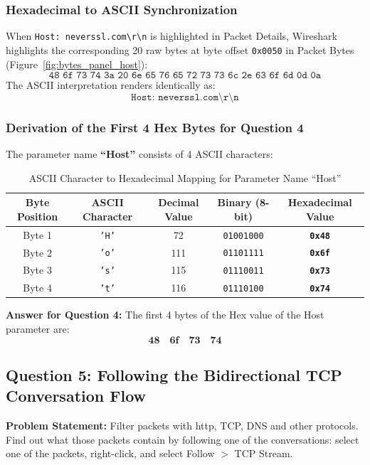 \documentclass[11pt,a4paper]{article}
\begin{document}
\subsubsection{Hexadecimal to ASCII Synchronization}
When \texttt{Host: neverssl.com\textbackslash r\textbackslash n} is highlighted in Packet Details, Wireshark highlights the corresponding 20 raw bytes at byte offset \texttt{0x0050} in Packet Bytes (Figure~\ref{fig:bytes_panel_host}):
$$\texttt{48 6f 73 74 3a 20 6e 65 76 65 72 73 73 6c 2e 63 6f 6d 0d 0a}$$
The ASCII interpretation renders identically as:
$$\texttt{Host: neverssl.com\textbackslash r\textbackslash n}$$

\subsubsection{Derivation of the First 4 Hex Bytes for Question 4}
The parameter name \textbf{``Host''} consists of 4 ASCII characters:
\begin{table}[H]
\centering
\caption{ASCII Character to Hexadecimal Mapping for Parameter Name ``Host''}
\label{tab:ascii_hex}
\begin{tabular}{ccccc}
\toprule
\textbf{Byte Position} & \textbf{ASCII Character} & \textbf{Decimal Value} & \textbf{Binary (8-bit)} & \textbf{Hexadecimal Value} \\
\midrule
Byte 1 & \texttt{'H'} & 72 & \texttt{01001000} & \texttt{\textbf{0x48}} \\
Byte 2 & \texttt{'o'} & 111 & \texttt{01101111} & \texttt{\textbf{0x6f}} \\
Byte 3 & \texttt{'s'} & 115 & \texttt{01110011} & \texttt{\textbf{0x73}} \\
Byte 4 & \texttt{'t'} & 116 & \texttt{01110100} & \texttt{\textbf{0x74}} \\
\bottomrule
\end{tabular}
\end{table}

\textbf{Answer for Question 4:} The first 4 bytes of the Hex value of the Host parameter are:
$$\mathbf{48 \quad 6f \quad 73 \quad 74}$$

\subsection{Question 5: Following the Bidirectional TCP Conversation Flow}
\textbf{Problem Statement:} Filter packets with http, TCP, DNS and other protocols. Find out what those packets contain by following one of the conversations: select one of the packets, right-click, and select Follow $>$ TCP Stream.
\end{document}

